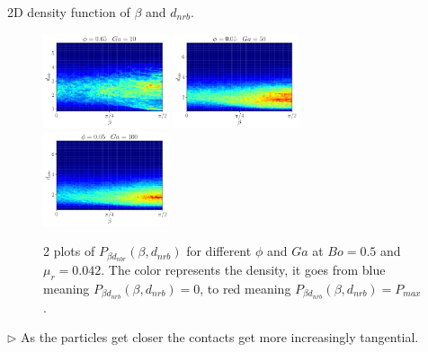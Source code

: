 \documentclass{sintefbeamer}
\begin{document}
\begin{frame}{2D density function of $\beta$ and $d_{nrb}$.}
  \begin{figure}[h!]
    \centering
    \includegraphics[width = 0.33\textwidth]{image/N_10/beta/2DMAP_beta_distmin_dmin_10_Bo1PHI0_05mu_r0_42Ga10.pdf}
    \includegraphics[width = 0.33\textwidth]{image/N_10/beta/2DMAP_beta_distmin_dmin_10_Bo1PHI0_05mu_r0_42Ga50.pdf}
    \includegraphics[width = 0.33\textwidth]{image/N_10/beta/2DMAP_beta_distmin_dmin_10_Bo1PHI0_05mu_r0_42Ga100.pdf}
    \caption{2 plots of $P_{\beta d_{nbr}}(\beta,d_{nrb})$ for different $\phi$ and $Ga$ at $Bo = 0.5$ and $\mu_r = 0.042$. The color represents the density, it goes from blue meaning $P_{\beta d_{nrb}}(\beta,d_{nrb})= 0$, to red meaning $P_{\beta d_{nrb}}(\beta,d_{nrb}) = P_{max}$. } 
\end{figure} 

$\triangleright$ As the particles get closer the contacts get more increasingly tangential. 

\end{frame}
\end{document}
